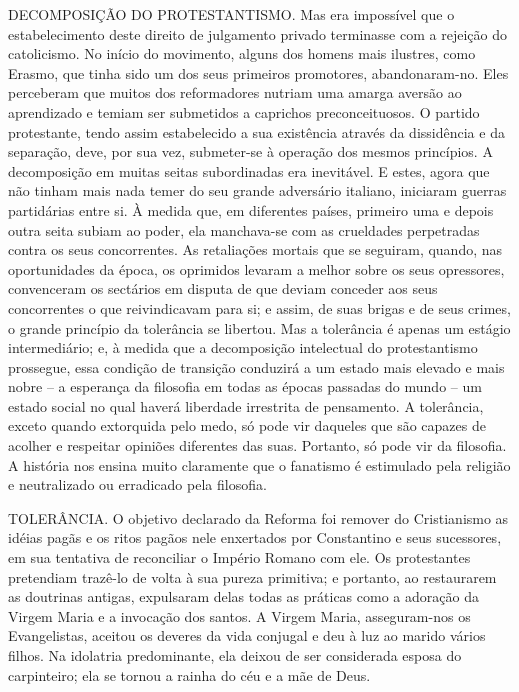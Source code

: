 \documentclass[11pt,a5paper,twoside,openany]{book}
\begin{document}
DECOMPOSIÇÃO DO PROTESTANTISMO. Mas era impossível que o estabelecimento deste direito de julgamento privado terminasse com a rejeição do catolicismo. No início do movimento, alguns dos homens mais ilustres, como Erasmo, que tinha sido um dos seus primeiros promotores, abandonaram-no. Eles perceberam que muitos dos reformadores nutriam uma amarga aversão ao aprendizado e temiam ser submetidos a caprichos preconceituosos. O partido protestante, tendo assim estabelecido a sua existência através da dissidência e da separação, deve, por sua vez, submeter-se à operação dos mesmos princípios. A decomposição em muitas seitas subordinadas era inevitável. E estes, agora que não tinham mais nada temer do seu grande adversário italiano, iniciaram guerras partidárias entre si. À medida que, em diferentes países, primeiro uma e depois outra seita subiam ao poder, ela manchava-se com as crueldades perpetradas contra os seus concorrentes. As retaliações mortais que se seguiram, quando, nas oportunidades da época, os oprimidos levaram a melhor sobre os seus opressores, convenceram os sectários em disputa de que deviam conceder aos seus concorrentes o que reivindicavam para si; e assim, de suas brigas e de seus crimes, o grande princípio da tolerância se libertou. Mas a tolerância é apenas um estágio intermediário; e, à medida que a decomposição intelectual do protestantismo prossegue, essa condição de transição conduzirá a um estado mais elevado e mais nobre – a esperança da filosofia em todas as épocas passadas do mundo – um estado social no qual haverá liberdade irrestrita de pensamento. A tolerância, exceto quando extorquida pelo medo, só pode vir daqueles que são capazes de acolher e respeitar opiniões diferentes das suas. Portanto, só pode vir da filosofia. A história nos ensina muito claramente que o fanatismo é estimulado pela religião e neutralizado ou erradicado pela filosofia.

TOLERÂNCIA. O objetivo declarado da Reforma foi remover do Cristianismo as idéias pagãs e os ritos pagãos nele enxertados por Constantino e seus sucessores, em sua tentativa de reconciliar o Império Romano com ele. Os protestantes pretendiam trazê-lo de volta à sua pureza primitiva; e portanto, ao restaurarem as doutrinas antigas, expulsaram delas todas as práticas como a adoração da Virgem Maria e a invocação dos santos. A Virgem Maria, asseguram-nos os Evangelistas, aceitou os deveres da vida conjugal e deu à luz ao marido vários filhos. Na idolatria predominante, ela deixou de ser considerada esposa do carpinteiro; ela se tornou a rainha do céu e a mãe de Deus.
\end{document}
